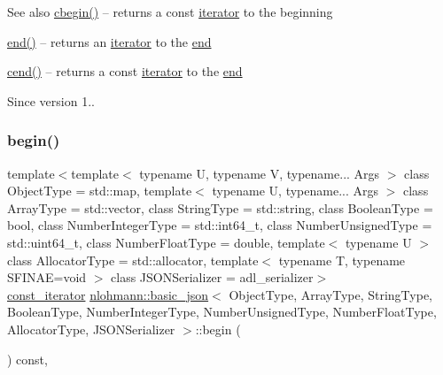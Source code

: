 \begin{DoxySeeAlso}{See also}
\mbox{\hyperlink{classnlohmann_1_1basic__json_ad865d6c291b237ae508d5cb2146b5877}{cbegin()}} -- returns a const \mbox{\hyperlink{classnlohmann_1_1basic__json_a099316232c76c034030a38faa6e34dca}{iterator}} to the beginning 

\mbox{\hyperlink{classnlohmann_1_1basic__json_a13e032a02a7fd8a93fdddc2fcbc4763c}{end()}} -- returns an \mbox{\hyperlink{classnlohmann_1_1basic__json_a099316232c76c034030a38faa6e34dca}{iterator}} to the \mbox{\hyperlink{classnlohmann_1_1basic__json_a13e032a02a7fd8a93fdddc2fcbc4763c}{end}} 

\mbox{\hyperlink{classnlohmann_1_1basic__json_a8dba7b7d2f38e6b0c614030aa43983f6}{cend()}} -- returns a const \mbox{\hyperlink{classnlohmann_1_1basic__json_a099316232c76c034030a38faa6e34dca}{iterator}} to the \mbox{\hyperlink{classnlohmann_1_1basic__json_a13e032a02a7fd8a93fdddc2fcbc4763c}{end}}
\end{DoxySeeAlso}
\begin{DoxySince}{Since}
version 1.. 
\end{DoxySince}
\mbox{\label{classnlohmann_1_1basic__json_a4f0f5dd42b2987ff20306ed78bd31d1d}} 
\subsubsection{\texorpdfstring{begin()}{begin()}\hspace{0.1cm}{\footnotesize\ttfamily [2/2]}}
{\footnotesize\ttfamily template$<$template$<$ typename U, typename V, typename... Args $>$ class Object\+Type = std\+::map, template$<$ typename U, typename... Args $>$ class Array\+Type = std\+::vector, class String\+Type  = std\+::string, class Boolean\+Type  = bool, class Number\+Integer\+Type  = std\+::int64\+\_\+t, class Number\+Unsigned\+Type  = std\+::uint64\+\_\+t, class Number\+Float\+Type  = double, template$<$ typename U $>$ class Allocator\+Type = std\+::allocator, template$<$ typename T, typename S\+F\+I\+N\+A\+E=void $>$ class J\+S\+O\+N\+Serializer = adl\+\_\+serializer$>$ \\
\mbox{\hyperlink{classnlohmann_1_1basic__json_a41a70cf9993951836d129bb1c2b3126a}{const\+\_\+iterator}} \mbox{\hyperlink{classnlohmann_1_1basic__json}{nlohmann\+::basic\+\_\+json}}$<$ Object\+Type, Array\+Type, String\+Type, Boolean\+Type, Number\+Integer\+Type, Number\+Unsigned\+Type, Number\+Float\+Type, Allocator\+Type, J\+S\+O\+N\+Serializer $>$\+::begin (\begin{DoxyParamCaption}{ }\end{DoxyParamCaption}) const\hspace{0.3cm}{\ttfamily [inline]}, {\ttfamily [noexcept]}}



